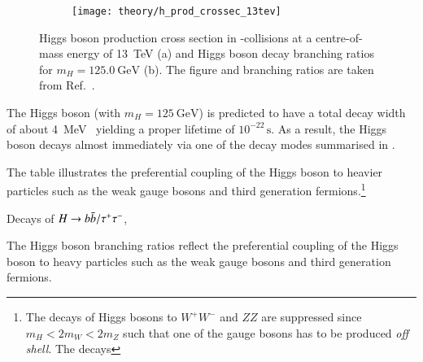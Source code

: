 \begin{figure}[htbp]
  \centering

  \begin{subfigure}[b]{0.47\textwidth}
    \centering

    \texttt{[image: theory/h\_prod\_crossec\_13tev]}

    \label{fig:higgs_prod_xsec}
  \end{subfigure}\hfill%
  \begin{subfigure}[b]{0.47\textwidth}
    \centering

    \renewcommand{\arraystretch}{1.1}%
    

    \vspace*{1.2em}

    \label{tab:higgs_branching_ratios}
  \end{subfigure}

  \caption{Higgs boson production cross section in \pp-collisions at a
    centre-of-mass energy of \SI{13}{\TeV} (a) and Higgs boson decay branching
    ratios for $m_{H} = \SI{125.0}{\GeV}$ (b). The figure and branching ratios
    are taken from Ref.~\cite{deFlorian:2016spz}.}
\end{figure}

The Higgs boson (with $m_{H} = \SI{125}{\GeV}$) is predicted to have a total
decay width of about \SI{4}{\MeV}~\cite{deFlorian:2016spz} yielding a proper
lifetime of $10^{-22}\,\si{\second}$. As a result, the Higgs boson decays almost
immediately via one of the decay modes summarised in
.





The table illustrates the preferential coupling of the Higgs boson to heavier
particles such as the weak gauge bosons and third generation
fermions.\footnote{The decays of Higgs bosons to $W^+W^-$ and $ZZ$ are
  suppressed since $m_{H} < 2 m_{W} < 2 m_{Z}$ such that one of the gauge bosons
  has to be produced \emph{off shell}. The decays }




Decays of $H \to b\bar{b} / \tau^+ \tau^-$,


The Higgs
boson branching ratios reflect the preferential coupling of the Higgs boson to
heavy particles such as the weak gauge bosons and third generation fermions.

